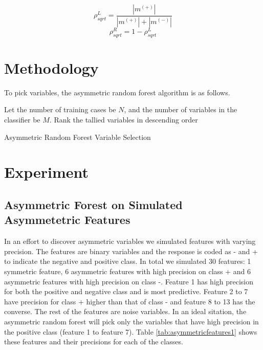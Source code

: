  \begin{equation}\label{eqn:rho_sqrt}
	\rho_{sqrt}^L = \frac{|m^{(+)}|}{|m^{(+)}|+|m^{(-)}|}
\end{equation}
\begin{equation}
	\rho_{sqrt}^R = 1- \rho_{sqrt}^L
\end{equation}


\section{Methodology}
To pick variables, the asymmetric random forest algorithm is as follows.

\begin{algorithm}
Let the number of training cases be $N$, and the number of variables in the classifier be $M$.
Rank the tallied variables in descending order 

\caption{Asymmetric Random Forest Variable Selection}\label{algo: AsymRandomForest}
\end{algorithm}

\section{Experiment}
\subsection{Asymmetric Forest on Simulated Asymmetetric Features}
In an effort to discover asymmetric variables we simulated features with varying precision. The features are binary variables and the response is coded as - and + to indicate the negative and positive class. In total we simulated 30 features: 1 symmetric feature, 6 asymmetric features with high precision on class + and 6 asymmetric features with high precision on class -. Feature 1 has high precision for both the positive and negative class and is most predictive. Feature 2 to 7 have precision for class + higher than that of class - and feature 8 to 13 has the converse. The rest of the features are noise variables. In an ideal sitation, the asymmetric random forest will pick only the variables that have high precision in the positive class (feature 1 to feature 7). Table \ref{tab:asymmetricfeatures1} shows these features and their precisions for each of the classes. 

